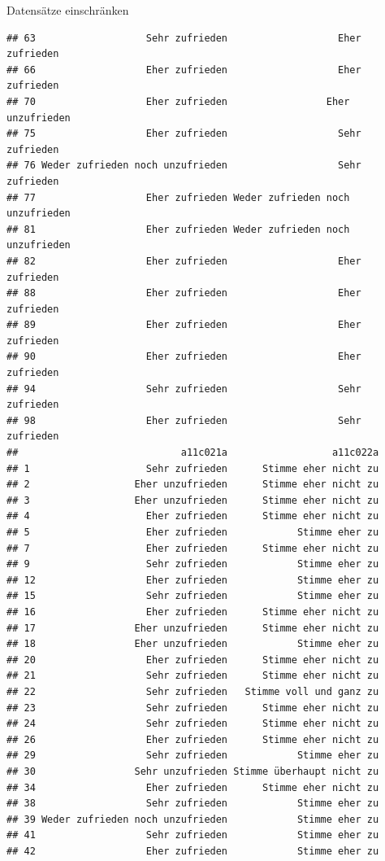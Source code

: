 \documentclass[ignorenonframetext,]{beamer}
\begin{document}
\begin{frame}[fragile]{Datensätze einschränken}
\begin{verbatim}
## 63                   Sehr zufrieden                   Eher zufrieden
## 66                   Eher zufrieden                   Eher zufrieden
## 70                   Eher zufrieden                 Eher unzufrieden
## 75                   Eher zufrieden                   Sehr zufrieden
## 76 Weder zufrieden noch unzufrieden                   Sehr zufrieden
## 77                   Eher zufrieden Weder zufrieden noch unzufrieden
## 81                   Eher zufrieden Weder zufrieden noch unzufrieden
## 82                   Eher zufrieden                   Eher zufrieden
## 88                   Eher zufrieden                   Eher zufrieden
## 89                   Eher zufrieden                   Eher zufrieden
## 90                   Eher zufrieden                   Eher zufrieden
## 94                   Sehr zufrieden                   Sehr zufrieden
## 98                   Eher zufrieden                   Sehr zufrieden
##                            a11c021a                  a11c022a
## 1                    Sehr zufrieden      Stimme eher nicht zu
## 2                  Eher unzufrieden      Stimme eher nicht zu
## 3                  Eher unzufrieden      Stimme eher nicht zu
## 4                    Eher zufrieden      Stimme eher nicht zu
## 5                    Eher zufrieden            Stimme eher zu
## 7                    Eher zufrieden      Stimme eher nicht zu
## 9                    Sehr zufrieden            Stimme eher zu
## 12                   Eher zufrieden            Stimme eher zu
## 15                   Sehr zufrieden            Stimme eher zu
## 16                   Eher zufrieden      Stimme eher nicht zu
## 17                 Eher unzufrieden      Stimme eher nicht zu
## 18                 Eher unzufrieden            Stimme eher zu
## 20                   Eher zufrieden      Stimme eher nicht zu
## 21                   Sehr zufrieden      Stimme eher nicht zu
## 22                   Sehr zufrieden   Stimme voll und ganz zu
## 23                   Sehr zufrieden      Stimme eher nicht zu
## 24                   Sehr zufrieden      Stimme eher nicht zu
## 26                   Eher zufrieden      Stimme eher nicht zu
## 29                   Sehr zufrieden            Stimme eher zu
## 30                 Sehr unzufrieden Stimme überhaupt nicht zu
## 34                   Eher zufrieden      Stimme eher nicht zu
## 38                   Sehr zufrieden            Stimme eher zu
## 39 Weder zufrieden noch unzufrieden            Stimme eher zu
## 41                   Sehr zufrieden            Stimme eher zu
## 42                   Eher zufrieden            Stimme eher zu

\end{verbatim}
\end{frame}
\end{document}

